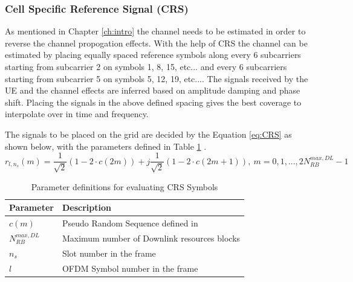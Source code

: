 \subsubsection{Cell Specific Reference Signal (CRS)} \label{sssec:CRS}
        As mentioned in Chapter \ref{ch:intro} the channel needs to be estimated in order to reverse the channel propogation effects. With the help of CRS the channel can be estimated by placing equally spaced reference symbols along every 6 subcarriers starting from subcarrier 2 on symbols 1, 8, 15, etc... and every 6 subcarriers starting from subcarrier 5 on symbols 5, 12, 19, etc...\cite{3gpp36211}. The signals received by the UE and the channel effects are inferred based on amplitude damping and phase shift. Placing the signals in the above defined spacing gives the best coverage to interpolate over in time and frequency.

        The signals to be placed on the grid are decided by the Equation \ref{eq:CRS} as shown below, with the parameters defined in Table \ref{tab:CRSParam} \cite{3gpp36211}.
        \begin{equation} \label{eq:CRS}
            r_{l,n_s}(m) = \frac{1}{\sqrt{2}}(1-2{\cdot}c(2m)) + j\frac{1}{\sqrt{2}}(1-2{\cdot}c(2m+1)),\ m=0,1,...,2N_{RB}^{max,DL}-1
        \end{equation}

        \begin{table}[H]
            \begin{center}
                \begin{tabular}{|l|l|}
                    \hline
                    Parameter& Description\\ \hline
                    $c(m)$& Pseudo Random Sequence defined in \cite{3gpp36211}\\ \hline
                    $N_{RB}^{max,DL}$& Maximum number of Downlink resources blocks\\ \hline
                    $n_s$& Slot number in the frame\\ \hline
                    $l$& OFDM Symbol number in the frame\\
                    \hline
                \end{tabular}
                \caption{Parameter definitions for evaluating CRS Symbols}
                \label{tab:CRSParam}
            \end{center}
        \end{table}


